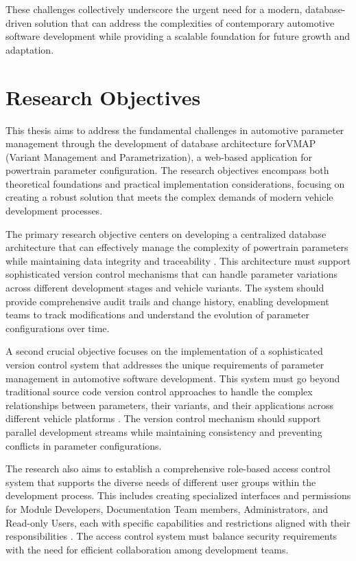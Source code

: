These challenges collectively underscore the urgent need for a modern, database-driven solution that can address the complexities of contemporary automotive software development while providing a scalable foundation for future growth and adaptation.

\section{Research Objectives}
\label{sec:objectives}

This thesis aims to address the fundamental challenges in automotive parameter management through the development of database architecture for\ac{VMAP} (Variant Management and Parametrization), a web-based application for powertrain parameter configuration. The research objectives encompass both theoretical foundations and practical implementation considerations, focusing on creating a robust solution that meets the complex demands of modern vehicle development processes.

The primary research objective centers on developing a centralized database architecture that can effectively manage the complexity of powertrain parameters while maintaining data integrity and traceability \cite{williams2004web}. This architecture must support sophisticated version control mechanisms that can handle parameter variations across different development stages and vehicle variants. The system should provide comprehensive audit trails and change history, enabling development teams to track modifications and understand the evolution of parameter configurations over time.

A second crucial objective focuses on the implementation of a sophisticated version control system that addresses the unique requirements of parameter management in automotive software development. This system must go beyond traditional source code version control approaches to handle the complex relationships between parameters, their variants, and their applications across different vehicle platforms \cite{staron2021automotive}. The version control mechanism should support parallel development streams while maintaining consistency and preventing conflicts in parameter configurations.

The research also aims to establish a comprehensive role-based access control system that supports the diverse needs of different user groups within the development process. This includes creating specialized interfaces and permissions for Module Developers, Documentation Team members, Administrators, and Read-only Users, each with specific capabilities and restrictions aligned with their responsibilities \cite{sandhu1998role}. The access control system must balance security requirements with the need for efficient collaboration among development teams.

